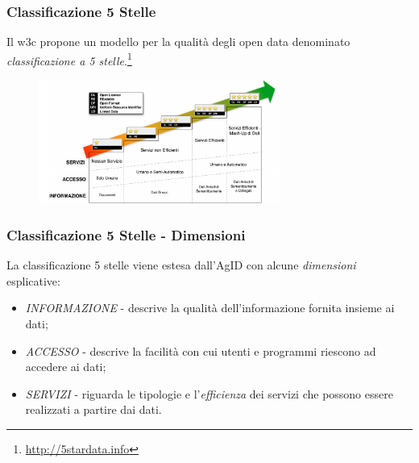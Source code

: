 \documentclass[8pt]{beamer}
\begin{document}
\begin{frame}
  \frametitle{Classificazione 5 Stelle}

  Il w3c propone un modello per la qualit\`a degli open data denominato
  \emph{classificazione a 5 stelle}.\footnote{\url{http://5stardata.info}}
  \vspace{\baselineskip}  
  
  \begin{figure}
     \includegraphics[width=300px]{5stelle_classificazione.png} 
  \end{figure}
\end{frame}

\begin{frame}
  \frametitle{Classificazione 5 Stelle - Dimensioni}
  La classificazione 5 stelle viene estesa dall'AgID con alcune \emph{dimensioni}
  esplicative:
  \begin{itemize}[<+->]
   \item \emph{INFORMAZIONE} - descrive la qualit\`a dell'informazione fornita insieme ai dati;
   \item \emph{ACCESSO} -  descrive la facilit\`a con cui utenti e programmi riescono ad accedere ai dati;
   \item \emph{SERVIZI} - riguarda le tipologie e l'\emph{efficienza} dei servizi che possono essere realizzati a partire 
   dai dati.
  \end{itemize}
\end{frame}
\end{document}
